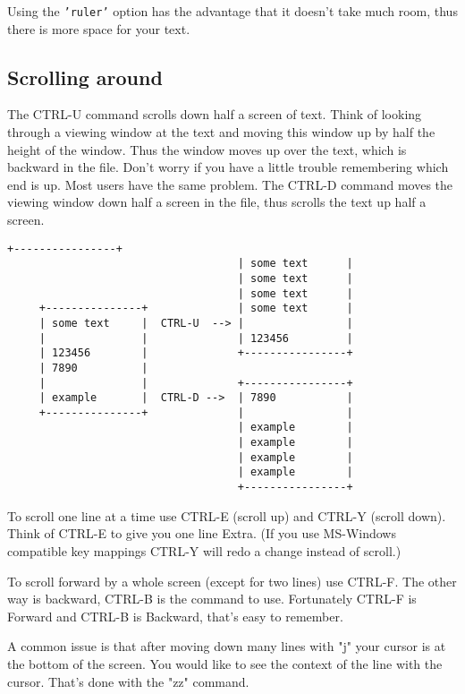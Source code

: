 Using the \texttt{'ruler'} option has the advantage that it doesn't take much room,
thus there is more space for your text.

\subsection{Scrolling around}

The CTRL-U command scrolls down half a screen of text.
Think of looking through a viewing window at the text and moving this window up by half the height of the window.
Thus the window moves up over the text, which is backward in the file.
Don't worry if you have a little trouble remembering which end is up.
Most users have the same problem.
The CTRL-D command moves the viewing window down half a screen in the file, thus scrolls the text up half a screen.

\begin{Verbatim}[samepage=true]
                                    +----------------+
                                    | some text      |
                                    | some text      |
                                    | some text      |
     +---------------+              | some text      |
     | some text     |  CTRL-U  --> |                |
     |               |              | 123456         |
     | 123456        |              +----------------+
     | 7890          |
     |               |              +----------------+
     | example       |  CTRL-D -->  | 7890           |
     +---------------+              |                |
                                    | example        |
                                    | example        |
                                    | example        |
                                    | example        |
                                    +----------------+
\end{Verbatim}
 
To scroll one line at a time use CTRL-E (scroll up) and CTRL-Y (scroll down).
Think of CTRL-E to give you one line Extra.
(If you use MS-Windows compatible key mappings CTRL-Y will redo a change instead of scroll.)

To scroll forward by a whole screen (except for two lines) use CTRL-F.
The other way is backward, CTRL-B is the command to use.
Fortunately CTRL-F is Forward and CTRL-B is Backward, that's easy to remember.

A common issue is that after moving down many lines with "j" your cursor is at the bottom of the screen.
You would like to see the context of the line with the cursor.
That's done with the "zz" command.

